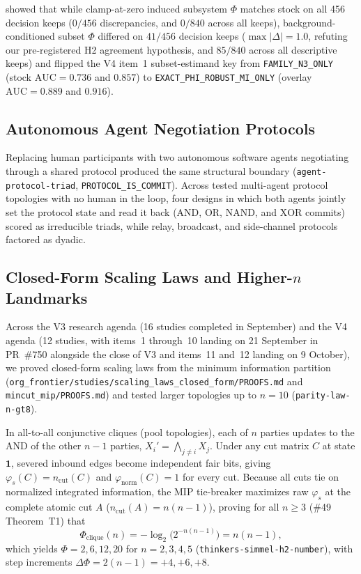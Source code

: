 \documentclass[11pt,a4paper]{article}
\begin{document}
showed that while clamp-at-zero induced subsystem $\Phi$ matches stock on all 456 decision keeps ($0/456$ discrepancies, and $0/840$ across all keeps), background-conditioned subset $\Phi$ differed on $41/456$ decision keeps ($\max|\Delta| = 1.0$, refuting our pre-registered H2 agreement hypothesis, and $85/840$ across all descriptive keeps) and flipped the V4 item~1 subset-estimand key from \texttt{FAMILY\_N3\_ONLY} (stock $\mathrm{AUC} = 0.736$ and $0.857$) to \texttt{EXACT\_PHI\_ROBUST\_MI\_ONLY} (overlay $\mathrm{AUC} = 0.889$ and $0.916$).

\subsection{Autonomous Agent Negotiation Protocols}

Replacing human participants with two autonomous software agents negotiating through a shared protocol produced the same structural boundary (\texttt{agent-protocol-triad}, \texttt{PROTOCOL\_IS\_COMMIT}). Across tested multi-agent protocol topologies with no human in the loop, four designs in which both agents jointly set the protocol state and read it back ($\mathrm{AND}$, $\mathrm{OR}$, $\mathrm{NAND}$, and $\mathrm{XOR}$ commits) scored as irreducible triads, while relay, broadcast, and side-channel protocols factored as dyadic.

\subsection{Closed-Form Scaling Laws and Higher-\texorpdfstring{$n$}{n} Landmarks}

Across the V3 research agenda (16 studies completed in September) and the V4 agenda (12 studies, with items~1 through~10 landing on 21 September in PR~\#750 alongside the close of V3 and items~11 and~12 landing on 9 October), we proved closed-form scaling laws from the minimum information partition (\texttt{org\_frontier/studies/scaling\_laws\_closed\_form/PROOFS.md} and \texttt{mincut\_mip/PROOFS.md}) and tested larger topologies up to $n = 10$ (\texttt{parity-law-n-gt8}).

In all-to-all conjunctive cliques (pool topologies), each of $n$ parties updates to the $\mathrm{AND}$ of the other $n - 1$ parties, $X_i' = \bigwedge_{j \neq i} X_j$. Under any cut matrix $C$ at state $\mathbf{1}$, severed inbound edges become independent fair bits, giving $\varphi_s(C) = n_{\mathrm{cut}}(C)$ and $\varphi_{\mathrm{norm}}(C) = 1$ for every cut. Because all cuts tie on normalized integrated information, the MIP tie-breaker maximizes raw $\varphi_s$ at the complete atomic cut $A$ ($n_{\mathrm{cut}}(A) = n(n - 1)$), proving for all $n \ge 3$ (\#49 Theorem~T1) that
\begin{equation}
  \Phi_{\mathrm{clique}}(n) = -\log_2\!\bigl(2^{-n(n-1)}\bigr) = n(n - 1), \label{eq:clique}
\end{equation}
which yields $\Phi = 2, 6, 12, 20$ for $n = 2, 3, 4, 5$ (\texttt{thinkers-simmel-h2-number}), with step increments $\Delta\Phi = 2(n - 1) = +4, +6, +8$.
\end{document}
